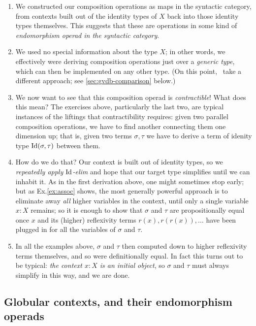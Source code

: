 \begin{enumerate}
\item We constructed our composition operations as maps in the syntactic category, from contexts built out of the identity types of $X$ back into those identity types themselves.  This suggests that these are operations in some kind of \emph{endomorphism operad in the syntactic category}.

\item We used no special information about the type $X$; in other words, we effectively were deriving composition operations just over a \emph{generic type}, which can then be implemented on any other type.  (On this point, \cite{garner-van-den-berg}\ take a different approach; see \PARA\ref{sec:gvdb-comparison} below.)

\item We now want to see that this composition operad is \emph{contractible}!  What does this mean?  The exercises above, particularly the last two, are typical instances of the liftings that contractibility requires: given two parallel composition operations, we have to find another connecting them one dimension up; that is, given two terms $\sigma,\tau$ we have to derive a term of idenity type $\mathrm{Id}(\sigma,\tau)$ between them.

\item How do we do that?  Our context is built out of identity types, so we \emph{repeatedly apply $\mathrm{Id}$-elim} and hope that our target type simplifies until we can inhabit it.  As in the first derivation above, one might sometimes stop early; but as Ex.\ref{ex:assoc} shows, the most generally powerful approach is to eliminate away \emph{all} higher variables in the context, until only a single variable $x:X$ remains; so it is enough to show that $\sigma$ and $\tau$ are propositionally equal once $x$ and its (higher) reflexivity terms $r(x), r(r(x)),\ldots$ have been plugged in for all the variables of $\sigma$ and $\tau$. 

\item In all the examples above, $\sigma$ and $\tau$ then computed down to higher reflexivity terms themselves, and so were definitionally equal.  In fact this turns out to be typical: \emph{the context $x:X$ is an initial object}, so $\sigma$ and $\tau$ must always simplify in this way, and we are done.
\end{enumerate}

\subsection{Globular contexts, and their endomorphism operads}

